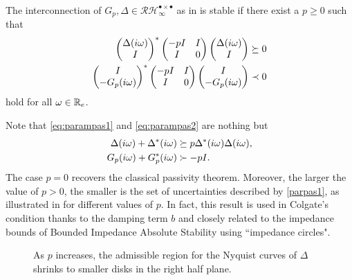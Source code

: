\begin{coroll}\label{thm:desvidpass} The interconnection of $G_p,\Delta\in 
\mathcal{RH}^{\bullet \times \bullet}_\infty$ as in  is stable
if there exist a ${p\geq 0}$ such that
\begin{align}
\begin{pmatrix}\Delta(i\omega)\\I\end{pmatrix}^*\begin{pmatrix}-pI &I\\I &0\end{pmatrix}\begin{pmatrix}\Delta(i\omega)\\ I\end{pmatrix} &\succeq 0 \label{eq:parampas1}\\
\begin{pmatrix}I\\ -G_p(i\omega)\end{pmatrix}^*\begin{pmatrix}-pI &I\\I &0\end{pmatrix}\begin{pmatrix}I\\ -G_p(i\omega)\end{pmatrix} &\prec 0 \label{eq:parampas2}
\end{align} hold for all $\omega\in\mathbb{R}_e$.
\end{coroll}

\begin{rem}Note that \eqref{eq:parampas1} and \eqref{eq:parampas2} are nothing but
\begin{align}
	\Delta(i\omega) + \Delta^*(i\omega) &\succeq p\Delta^*(i\omega)\Delta(i\omega),\label{parpas1}\\
	G_p(i\omega) + G_p^*(i\omega) &\succ -pI.\label{parpas2}
\end{align}
The case $p=0$ recovers the classical passivity theorem. Moreover, the larger the value of $p>0$, 
the smaller is the set of uncertainties described by \eqref{parpas1}, as illustrated in  
for different values of $p$. In fact, this result is used in Colgate's condition thanks to the damping term 
$b$ and closely related to the impedance bounds of Bounded Impedance Absolute Stability \cite{haddadizaad} 
using ``impedance circles".
\end{rem}

\begin{figure}%
\centering
{}
\caption[Parametrized strictly output passive uncertainty regions]{As $p$ increases, the admissible region for the Nyquist curves of $\Delta$ shrinks to smaller disks in the right half plane.}
\label{fig:pregions}%
\end{figure}


